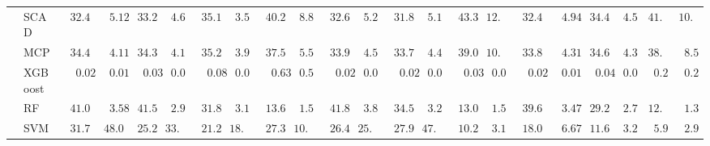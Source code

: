 \begin{tabular}{p{0.2cm}p{1cm}|p{0.6cm}p{0.6cm}|p{0.6cm}p{0.6cm}p{0.6cm}p{0.6cm}p{0.6cm}p{0.6cm}|p{0.6cm}p{0.6cm}p{0.6cm}p{0.6cm}p{0.6cm}p{0.6cm}|p{0.6cm}p{0.6cm}p{0.6cm}p{0.6cm}p{0.6cm}p{0.6cm}}
 & SCAD  & $\phantom{0}32.40$ & $\phantom{00}5.12$ & $\phantom{0}33.21$ & $\phantom{0}4.61$ & $\phantom{0}35.10$ & $\phantom{0}3.55$ & $\phantom{0}40.28$ & $\phantom{0}8.85$ & $\phantom{0}32.60$ & $\phantom{0}5.25$ & $\phantom{0}31.86$ & $\phantom{0}5.12$ & $\phantom{0}43.32$ & $12.36$ & $\phantom{0}32.43$ & $\phantom{00}4.94$ & $\phantom{0}34.46$ & $\phantom{0}4.50$ & $41.14$ & $10.68$ \\
 & MCP  & $\phantom{0}34.43$ & $\phantom{00}4.11$ & $\phantom{0}34.34$ & $\phantom{0}4.14$ & $\phantom{0}35.21$ & $\phantom{0}3.91$ & $\phantom{0}37.57$ & $\phantom{0}5.51$ & $\phantom{0}33.95$ & $\phantom{0}4.51$ & $\phantom{0}33.71$ & $\phantom{0}4.48$ & $\phantom{0}39.01$ & $10.46$ & $\phantom{0}33.82$ & $\phantom{00}4.31$ & $\phantom{0}34.66$ & $\phantom{0}4.34$ & $38.88$ & $\phantom{0}8.54$ \\
 & XGBoost  & $\phantom{00}0.02$ & $\phantom{00}0.01$ & $\phantom{00}0.03$ & $\phantom{0}0.01$ & $\phantom{00}0.08$ & $\phantom{0}0.04$ & $\phantom{00}0.63$ & $\phantom{0}0.57$ & $\phantom{00}0.02$ & $\phantom{0}0.01$ & $\phantom{00}0.02$ & $\phantom{0}0.01$ & $\phantom{00}0.03$ & $\phantom{0}0.02$ & $\phantom{00}0.02$ & $\phantom{00}0.01$ & $\phantom{00}0.04$ & $\phantom{0}0.03$ & $\phantom{0}0.29$ & $\phantom{0}0.22$ \\
 & RF  & $\phantom{0}41.06$ & $\phantom{00}3.58$ & $\phantom{0}41.51$ & $\phantom{0}2.98$ & $\phantom{0}31.84$ & $\phantom{0}3.14$ & $\phantom{0}13.67$ & $\phantom{0}1.50$ & $\phantom{0}41.88$ & $\phantom{0}3.81$ & $\phantom{0}34.50$ & $\phantom{0}3.22$ & $\phantom{0}13.03$ & $\phantom{0}1.55$ & $\phantom{0}39.62$ & $\phantom{00}3.47$ & $\phantom{0}29.28$ & $\phantom{0}2.76$ & $12.71$ & $\phantom{0}1.31$ \\
 & SVM  & $\phantom{0}31.78$ & $\phantom{0}48.08$ & $\phantom{0}25.20$ & $33.41$ & $\phantom{0}21.21$ & $18.47$ & $\phantom{0}27.38$ & $10.80$ & $\phantom{0}26.42$ & $25.49$ & $\phantom{0}27.93$ & $47.38$ & $\phantom{0}10.23$ & $\phantom{0}3.16$ & $\phantom{0}18.08$ & $\phantom{00}6.67$ & $\phantom{0}11.61$ & $\phantom{0}3.26$ & $\phantom{0}5.92$ & $\phantom{0}2.97$ \\
\hline 
\end{tabular}

